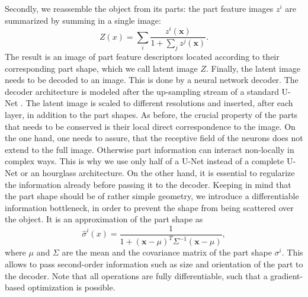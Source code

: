 		Secondly, we reassemble the object from its parts: the part feature images $z^i$ are summarized by summing in a single image:
		\begin{equation}
			Z(x) = \sum_i \frac{z^i(\mathbf{x})}{1 + \sum_j z^j(\mathbf{x})}.
		\end{equation}
		The result is an image of part feature descriptors located according to their corresponding part shape, which we call latent image $Z$.
		Finally, the latent image needs to be decoded to an image. This is done by a neural network decoder. The decoder architecture is modeled after the up-sampling stream of a standard U-Net \cite{ronneberger15unet}. The latent image is scaled to different resolutions and inserted, after each layer, in addition to the part shapes. As before, the crucial property of the parts that needs to be conserved is their local direct correspondence to the image. On the one hand, one needs to assure, that the receptive field of the neurons does not extend to the full image. Otherwise part information can interact non-locally in complex ways. This is why we use only half of a U-Net instead of a complete U-Net or an hourglass architecture.
		On the other hand, it is essential to regularize the information already before passing it to the decoder. Keeping in mind that the part shape should be of rather simple geometry, we introduce a differentiable information bottleneck, in order to prevent the shape from being scattered over the object. It is an approximation of the part shape as
		\begin{equation}\label{eq:approx}
			\hat {\sigma}^i(x) = \frac{1}{1 + (\mathbf{x} -\mu)^T \Sigma^{-1} (\mathbf{x} - \mu)},
		\end{equation}
		where $\mu$ and $\Sigma$ are the mean and the covariance matrix of the part shape ${\sigma}^i$. This allows to pass second-order information such as size and orientation of the part to the decoder. Note that all operations are fully differentiable, such that a gradient-based optimization is possible.


